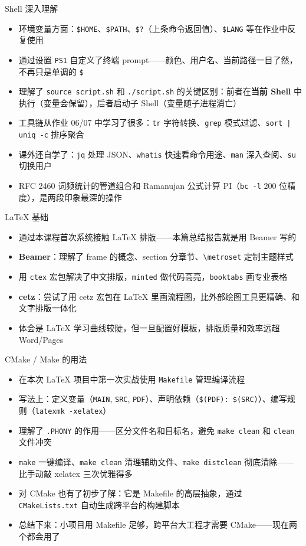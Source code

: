 \begin{frame}[fragile]{Shell 深入理解}
\begin{itemize}
  \item 环境变量方面：\texttt{\$HOME}、\texttt{\$PATH}、\texttt{\$?}（上条命令返回值）、\texttt{\$LANG} 等在作业中反复使用
  \item 通过设置 \texttt{PS1} 自定义了终端 prompt——颜色、用户名、当前路径一目了然，不再只是单调的 \texttt{\$}
  \item 理解了 \texttt{source script.sh} 和 \texttt{./script.sh} 的关键区别：前者在\textbf{当前 Shell} 中执行（变量会保留），后者启动子 Shell（变量随子进程消亡）
  \item 工具链从作业 06/07 中学习了很多：\texttt{tr} 字符转换、\texttt{grep} 模式过滤、\texttt{sort | uniq -c} 排序聚合
  \item 课外还自学了：\texttt{jq} 处理 JSON、\texttt{whatis} 快速看命令用途、\texttt{man} 深入查阅、\texttt{su} 切换用户
  \item RFC 2460 词频统计的管道组合和 Ramanujan 公式计算 PI（\texttt{bc -l} 200 位精度），是两段印象最深的操作
\end{itemize}
\end{frame}

\begin{frame}{LaTeX 基础}
\begin{itemize}
  \item 通过本课程首次系统接触 LaTeX 排版——本篇总结报告就是用 Beamer 写的
  \item \textbf{Beamer}：理解了 frame 的概念、section 分章节、\texttt{\textbackslash metroset} 定制主题样式
  \item 用 \texttt{ctex} 宏包解决了中文排版，\texttt{minted} 做代码高亮，\texttt{booktabs} 画专业表格
  \item \textbf{cetz}：尝试了用 cetz 宏包在 LaTeX 里画流程图，比外部绘图工具更精确、和文字排版一体化
  \item 体会是 LaTeX 学习曲线较陡，但一旦配置好模板，排版质量和效率远超 Word/Pages
\end{itemize}
\end{frame}

\begin{frame}{CMake / Make 的用法}
\begin{itemize}
  \item 在本次 LaTeX 项目中第一次实战使用 \texttt{Makefile} 管理编译流程
  \item 写法上：定义变量（\texttt{MAIN}, \texttt{SRC}, \texttt{PDF}）、声明依赖（\texttt{\$(PDF): \$(SRC)}）、编写规则（\texttt{latexmk -xelatex}）
  \item 理解了 \texttt{.PHONY} 的作用——区分文件名和目标名，避免 \texttt{make clean} 和 \texttt{clean} 文件冲突
  \item \texttt{make} 一键编译、\texttt{make clean} 清理辅助文件、\texttt{make distclean} 彻底清除——比手动敲 xelatex 三次优雅得多
  \item 对 CMake 也有了初步了解：它是 Makefile 的高层抽象，通过 \texttt{CMakeLists.txt} 自动生成跨平台的构建脚本
  \item 总结下来：小项目用 Makefile 足够，跨平台大工程才需要 CMake——现在两个都会用了
\end{itemize}
\end{frame}
